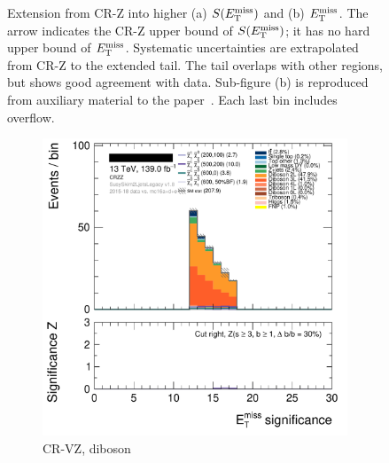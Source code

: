 \begin{figure}[tp]
\begin{subfigure}{0.48\textwidth}
\caption{}
\end{subfigure}
\caption[
Extension from CR-Z into higher $\metsig$ and $\met$
]{%
Extension from CR-Z into higher (a) $\metsig$ and (b) $\met$.
The arrow indicates the CR-Z  upper bound of $\metsig$; it has no hard
upper bound of $\met$.
Systematic uncertainties are extrapolated from CR-Z to the extended tail.
The tail overlaps with other regions, but shows good agreement with data.
Sub-figure (b) is reproduced from auxiliary material to the
paper~\cite{atlas2022searches}.
Each last bin includes overflow.
}
\label{fig:2ljets_low_crz_extensions}
\end{figure}

\begin{figure}[tp]
\centering
\begin{subfigure}{0.48\textwidth}
\centering
\includegraphics[width=\textwidth]{figures/2ljets_splits_met_Sign_CRZZ.png}
\caption{CR-VZ, diboson}
\end{subfigure}
\hfill
\begin{subfigure}{0.48\textwidth}
\centering

\end{subfigure}
\end{figure}
